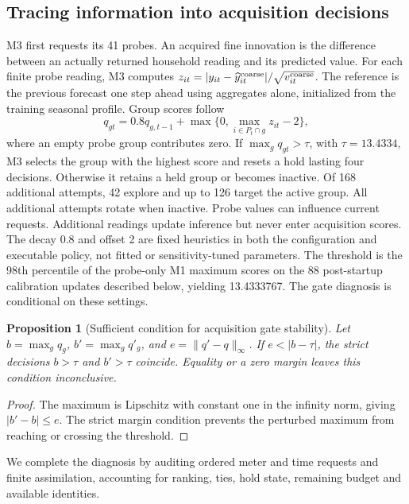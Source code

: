 \documentclass[conference]{IEEEtran}
\newtheorem{proposition}{Proposition}
\begin{document}
\subsection{Tracing information into acquisition decisions}
M3 first requests its 41 probes. An acquired fine innovation is the difference between an actually returned household reading and its predicted value. For each finite probe reading, M3 computes $z_{it}=|y_{it}-\widehat y^{\rm coarse}_{it}|/\sqrt{v^{\rm coarse}_{it}}$. The reference is the previous forecast one step ahead using aggregates alone, initialized from the training seasonal profile. Group scores follow
\begin{equation}
q_{gt}=0.8q_{g,t-1}+\max\{0,\max_{i\in P_t\cap g}z_{it}-2\},\label{eq:score}
\end{equation}
where an empty probe group contributes zero. If $\max_gq_{gt}>\tau$, with $\tau=13.4334$, M3 selects the group with the highest score and resets a hold lasting four decisions. Otherwise it retains a held group or becomes inactive. Of 168 additional attempts, 42 explore and up to 126 target the active group. All additional attempts rotate when inactive. Probe values can influence current requests. Additional readings update inference but never enter acquisition scores. The decay 0.8 and offset 2 are fixed heuristics in both the configuration and executable policy, not fitted or sensitivity-tuned parameters. The threshold is the 98th percentile of the probe-only M1 maximum scores on the 88 post-startup calibration updates described below, yielding 13.4333767. The gate diagnosis is conditional on these settings.

\begin{proposition}[Sufficient condition for acquisition gate stability]
Let $b=\max_gq_g$, $b'=\max_gq'_g$, and $e=\|q'-q\|_\infty$. If $e<|b-\tau|$, the strict decisions $b>\tau$ and $b'>\tau$ coincide. Equality or a zero margin leaves this condition inconclusive.
\end{proposition}
\begin{proof}
The maximum is Lipschitz with constant one in the infinity norm, giving $|b'-b|\le e$. The strict margin condition prevents the perturbed maximum from reaching or crossing the threshold.
\end{proof}

We complete the diagnosis by auditing ordered meter and time requests and finite assimilation, accounting for ranking, ties, hold state, remaining budget and available identities.
\end{document}
